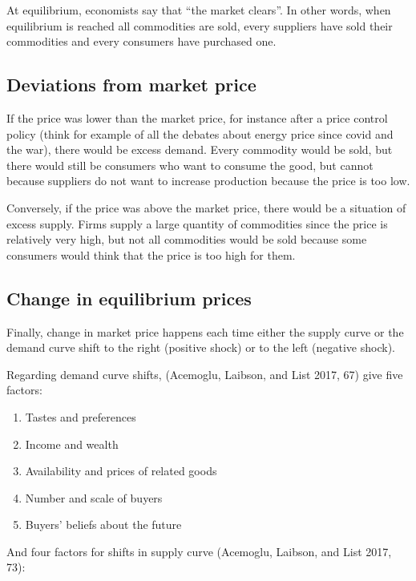 \documentclass[
  letterpaper,
  DIV=11,
  numbers=noendperiod]{scrreprt}
\providecommand{\tightlist}{%
  \setlength{\itemsep}{0pt}\setlength{\parskip}{0pt}}\usepackage{longtable,booktabs,array}
\begin{document}
At equilibrium, economists say that ``the market clears''. In other
words, when equilibrium is reached all commodities are sold, every
suppliers have sold their commodities and every consumers have purchased
one.

\hypertarget{deviations-from-market-price}{%
\subsection{Deviations from market
price}\label{deviations-from-market-price}}

If the price was lower than the market price, for instance after a price
control policy (think for example of all the debates about energy price
since covid and the war), there would be excess demand. Every commodity
would be sold, but there would still be consumers who want to consume
the good, but cannot because suppliers do not want to increase
production because the price is too low.

Conversely, if the price was above the market price, there would be a
situation of excess supply. Firms supply a large quantity of commodities
since the price is relatively very high, but not all commodities would
be sold because some consumers would think that the price is too high
for them.

\hypertarget{change-in-equilibrium-prices}{%
\subsection{Change in equilibrium
prices}\label{change-in-equilibrium-prices}}

Finally, change in market price happens each time either the supply
curve or the demand curve shift to the right (positive shock) or to the
left (negative shock).

Regarding demand curve shifts, (Acemoglu, Laibson, and List 2017, 67)
give five factors:

\begin{enumerate}
\def\labelenumi{\arabic{enumi}.}
\tightlist
\item
  Tastes and preferences
\item
  Income and wealth
\item
  Availability and prices of related goods
\item
  Number and scale of buyers
\item
  Buyers' beliefs about the future
\end{enumerate}

And four factors for shifts in supply curve (Acemoglu, Laibson, and List
2017, 73):
\end{document}

